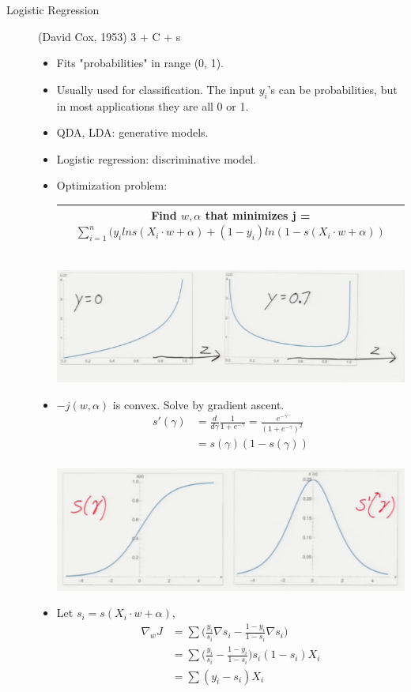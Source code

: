 \documentclass[10pt]{article}
\begin{document}
\begin{description}
	\item[Logistic Regression] (David Cox, 1953) 3 + C + s
		\begin{itemize}
			\item Fits "probabilities" in range (0, 1).
			\item Usually used for classification. The input $y_{i}$'s can be probabilities, but in most applications they are all 0 or 1.
			\item QDA, LDA: generative models.
			\item Logistic regression: discriminative model.
			\item Optimization problem:
				\begin{center}
					\begin{tabular}{|c|}
					\hline
						Find $w, \alpha$ that minimizes j = $\sum_{i=1}^{n}(y_{i} ln s(X_{i} \cdot w + \alpha) + (1-y_{i}) ln (1 - s(X_{i} \cdot w + \alpha))$\\
						\hline
					\end{tabular}\\
					[1em]
					\includegraphics[scale=0.5]{images/logistics}
				\end{center}
			\item $-j(w, \alpha)$ is convex. Solve by gradient ascent.
			\begin{align*}
				s'(\gamma) &= \frac{d}{d\gamma} \frac{1}{1 + e^{-\gamma}} = \frac{e^{-\gamma}}{(1 + e^{-\gamma})^{2}}\\
				&= s(\gamma)(1 - s(\gamma))\\
			\end{align*}
			\begin{center}
				\includegraphics[scale=0.5]{images/gradients}
			\end{center}
			\item Let $s_{i} = s(X_{i}\cdot w + \alpha)$,
			\begin{align*}
				\nabla_{w} J &= \sum\Big(\frac{y_{i}}{s_{i}}\nabla s_{i} - \frac{1-y_{i}}{1 - s_{i}} \nabla s_{i}\Big)\\
					&= \sum \Big(\frac{y_{i}}{s_{i}} - \frac{1-y_{i}}{1 - s_{i}}\Big) s_{i} (1 - s_{i})X_{i}\\
					&= \sum (y_{i} - s_{i})X_{i}
			\end{align*}
			

\end{itemize}
\end{description}
\end{document}
